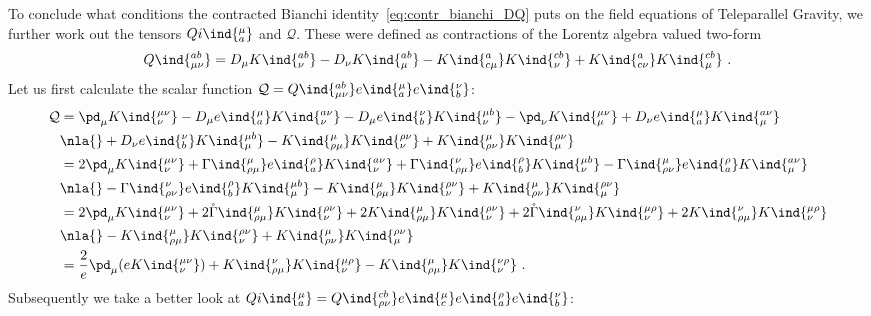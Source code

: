 \documentclass[11pt]{article}
\begin{document}
To conclude what conditions the contracted Bianchi 
identity~\eqref{eq:contr_bianchi_DQ} puts on the field equations 
of Teleparallel Gravity, we further work out the tensors 
$Qi\ind{^\mu_a}$ and $\mathcal{Q}$. These were defined as 
contractions of the Lorentz algebra valued two-form
\begin{displaymath}
	Q\ind{^{ab}_{\mu\nu}} = D_\mu K\ind{^{ab}_\nu} - D_\nu 
	K\ind{^{ab}_\mu} - K\ind{^a_{c\mu}} K\ind{^{cb}_\nu} + 
	K\ind{^a_{c\nu}} K\ind{^{cb}_\mu}~.
\end{displaymath}
Let us first calculate the scalar function $\mathcal{Q} = 
Q\ind{^{ab}_{\mu\nu}} e\ind{_a^\mu} e\ind{_b^\nu}$:
\begin{align*}
	\mathcal{Q} &= \pd_\mu K\ind{^{\mu\nu}_\nu} - D_\mu 
	e\ind{_a^\mu} K\ind{^{a\nu}_\nu} - D_\mu e\ind{_b^\nu} 
	K\ind{^{\mu b}_\nu} - \pd_\nu K\ind{^{\mu\nu}_\mu} + D_\nu 
	e\ind{_a^\mu} K\ind{^{a\nu}_\mu}  \\
	&\nla{}+ D_\nu e\ind{_b^\nu} K\ind{^{\mu b}_\mu} - 
	K\ind{^\mu_{\rho \mu}} K\ind{^{\rho\nu}_\nu} + 
	K\ind{^\mu_{\rho \nu}} K\ind{^{\rho\nu}_\mu} \\
	&= 2 \pd_\mu K\ind{^{\mu\nu}_\nu} + \Gamma\ind{^\mu_{\rho\mu}} 
	e\ind{_a^\rho} K\ind{^{a\nu}_\nu} + \Gamma\ind{^\nu_{\rho\mu}} 
	e\ind{_b^\rho} K\ind{^{\mu b}_\nu} - 
	\Gamma\ind{^\mu_{\rho\nu}} e\ind{_a^\rho} K\ind{^{a \nu}_\mu} 
	\\
	&\nla{}- \Gamma\ind{^\nu_{\rho\nu}} e\ind{_b^\rho}
	K\ind{^{\mu b}_\mu} - K\ind{^\mu_{\rho \mu}} 
	K\ind{^{\rho\nu}_\nu} + K\ind{^\mu_{\rho \nu}} 
	K\ind{^{\rho\nu}_\mu} \\
	&= 2 \pd_\mu K\ind{^{\mu\nu}_\nu} + 2 
	\mathring{\Gamma}\ind{^\mu_{\rho\mu}} K\ind{^{\rho\nu}_\nu} + 
	2 K\ind{^\mu_{\rho \mu}} K\ind{^{\rho\nu}_\nu} + 2 
	\mathring{\Gamma}\ind{^\nu_{\rho\mu}} K\ind{^{\mu\rho}_\nu} + 
	2 K\ind{^\nu_{\rho\mu}} K\ind{^{\mu\rho}_\nu} \\
	&\nla{}- K\ind{^\mu_{\rho \mu}} K\ind{^{\rho\nu}_\nu} + 
	K\ind{^\mu_{\rho \nu}} K\ind{^{\rho\nu}_\mu} \\
	&= \frac{2}{e} \pd_\mu( e K\ind{^{\mu\nu}_\nu}) + 
	K\ind{^\nu_{\rho\mu}} K\ind{^{\mu\rho}_\nu} - K\ind{^\mu_{\rho 
			\mu}} K\ind{^{\nu\rho}_\nu}~.
\end{align*}
Subsequently we take a better look at $Qi\ind{^\mu_a} =
Q\ind{^{cb}_{\rho\nu}} e\ind{_c^\mu} e\ind{_a^\rho} 
e\ind{_b^\nu}$:
\end{document}
